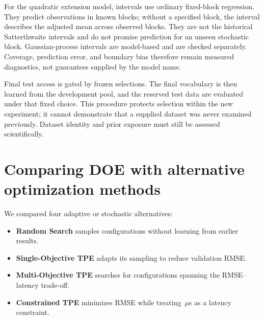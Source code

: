 \documentclass[12pt,a4paper]{article}
\newcommand{\term}[1]{\textbf{#1}}
\begin{document}
For the quadratic extension model, intervals use ordinary fixed-block regression. They predict observations in known blocks; without a specified block, the interval describes the adjusted mean across observed blocks. They are not the historical Satterthwaite intervals and do not promise prediction for an unseen stochastic block. Gaussian-process intervals are model-based and are checked separately. Coverage, prediction error, and boundary bias therefore remain measured diagnostics, not guarantees supplied by the model name.

Final test access is gated by frozen selections. The final vocabulary is then learned from the development pool, and the reserved test data are evaluated under that fixed choice. This procedure protects selection within the new experiment; it cannot demonstrate that a supplied dataset was never examined previously. Dataset identity and prior exposure must still be assessed scientifically.

\clearpage
\section{Comparing DOE with alternative optimization methods}
We compared four adaptive or stochastic alternatives:
\begin{itemize}
\item \term{Random Search} samples configurations without learning from earlier results.
\item \term{Single-Objective TPE} adapts its sampling to reduce validation RMSE.
\item \term{Multi-Objective TPE} searches for configurations spanning the RMSE--latency trade-off.
\item \term{Constrained TPE} minimizes RMSE while treating \numPubLatencyLimit\,$\mu$s as a latency constraint.
\end{itemize}
\end{document}
